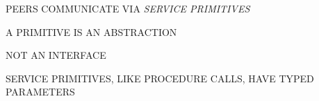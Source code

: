 %




\begin{bwslide}

\begin{nrtc}
\item   PEERS COMMUNICATE VIA \emph{SERVICE PRIMITIVES}

\item   A PRIMITIVE IS AN ABSTRACTION
    \begin{nrtc}
    \item       NOT AN INTERFACE
    \end{nrtc}

\item   SERVICE PRIMITIVES, LIKE PROCEDURE CALLS, HAVE TYPED PARAMETERS
\end{nrtc}
\end{bwslide}


%
%
%
%


